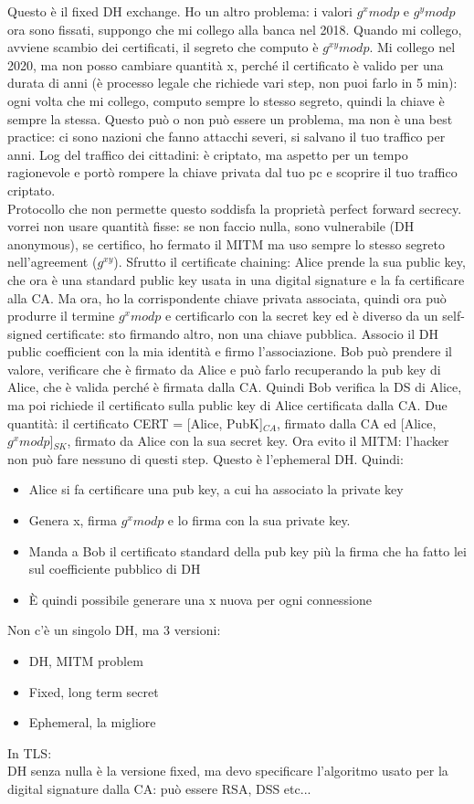 \documentclass[16px]{article}
\begin{document}
Questo è il fixed DH exchange. Ho un altro problema: i valori $g^xmodp$ e $g^ymodp$ ora sono fissati, suppongo che mi collego alla banca nel 2018. Quando mi collego, avviene scambio dei certificati, il segreto che computo è $g^{xy}modp$. Mi collego nel 2020, ma non posso cambiare quantità x, perché il certificato è valido per una durata di anni (è processo legale che richiede vari step, non puoi farlo in 5 min): ogni volta che mi collego, computo sempre lo stesso segreto, quindi la chiave è sempre la stessa. Questo può o non può essere un problema, ma non è una best practice: ci sono nazioni che fanno attacchi severi, si salvano il tuo traffico per anni. Log del traffico dei cittadini: è criptato, ma aspetto per un tempo ragionevole e portò rompere la chiave privata dal tuo pc e scoprire il tuo traffico criptato.\\ Protocollo che non permette questo soddisfa la proprietà perfect forward secrecy.\\ vorrei non usare quantità fisse: se non faccio nulla, sono vulnerabile (DH anonymous), se certifico, ho fermato il MITM ma uso sempre lo stesso segreto nell'agreement ($g^{xy}$). Sfrutto il certificate chaining: Alice prende la sua public key, che ora è una standard public key usata in una digital signature e la fa certificare alla CA. Ma ora, ho la corrispondente chiave privata associata, quindi ora può produrre il termine $g^xmodp$ e certificarlo con la secret key ed è diverso da un self-signed certificate: sto firmando altro, non una chiave pubblica. Associo il DH public coefficient con la mia identità e firmo l'associazione. Bob può prendere il valore, verificare che è firmato da Alice e può farlo recuperando la pub key di Alice, che è valida perché è firmata dalla CA. Quindi Bob verifica la DS di Alice, ma poi richiede il certificato sulla public key di Alice certificata dalla CA. Due quantità: il certificato CERT = [Alice, PubK]$_{CA}$, firmato dalla CA ed [Alice, $g^xmodp$]$_{SK}$, firmato da Alice con la sua secret key. Ora evito il MITM: l'hacker non può fare nessuno di questi step. Questo è l'ephemeral DH. Quindi:
\begin{itemize}
\item Alice si fa certificare una pub key, a cui ha associato la private key
\item Genera x, firma $g^xmodp$ e lo firma con la sua private key.
\item Manda a Bob il certificato standard della pub key più la firma che ha fatto lei sul coefficiente pubblico di DH
\item È quindi possibile generare una x nuova per ogni connessione
\end{itemize} Non c'è un singolo DH, ma 3 versioni:
\begin{itemize}
\item DH, MITM problem
\item Fixed, long term secret
\item Ephemeral, la migliore
\end{itemize}
In TLS:\\
DH senza nulla è la versione fixed, ma devo specificare l'algoritmo usato per la digital signature dalla CA: può essere RSA, DSS etc...
\end{document}
